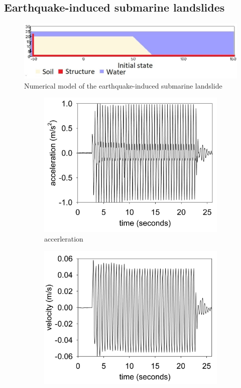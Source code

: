\documentclass[preprint,12pt]{elsarticle}
\begin{document}
\subsection{\textsf{Earthquake-induced submarine landslides}}
%
%
\begin{figure}[H]
\center
\includegraphics[scale=0.5]{schematic.jpeg}
\caption{Numerical model of the earthquake-induced submarine landslide}
\label{fig:scheme}
\end {figure}
%
%
\begin{figure}[H]
\center
\begin{subfigure}[c]{0.5\linewidth}
\includegraphics[width=\linewidth]{acer.jpg}
\caption{accerleration}
\label{groundacceleration_accerleration}
\end {subfigure}\hfill    
\begin{subfigure}[d]{0.5\linewidth}
\includegraphics[width=\linewidth]{vel.jpg}

\end{subfigure}
\end{figure}
\end{document}
